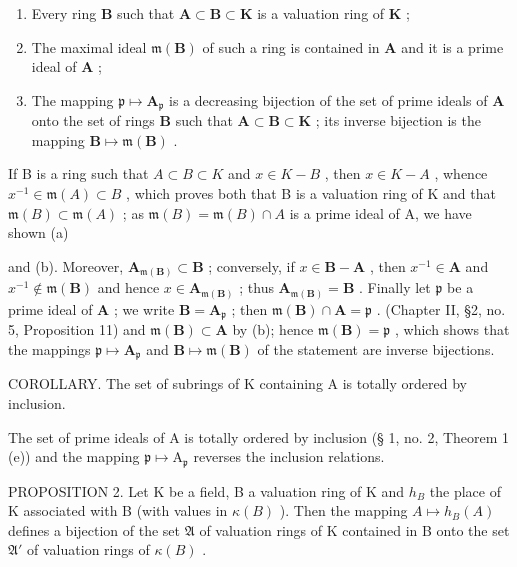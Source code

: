 \begin{enumerate}
\def\labelenumi{(\alph{enumi})}
\item
  Every ring \(\mathbf{B}\) such that \(\mathbf{A} \subset \mathbf{B} \subset \mathbf{K}\) is a valuation ring of \(\mathbf{K}\) ;
\item
  The maximal ideal \(\mathfrak{m}(\mathbf{B})\) of such a ring is contained in \(\mathbf{A}\) and it is a prime ideal of \(\mathbf{A}\) ;
\item
  The mapping \(\mathfrak{p} \mapsto \mathbf{A}_{\mathfrak{p}}\) is a decreasing bijection of the set of prime ideals of \(\mathbf{A}\) onto the set of rings \(\mathbf{B}\) such that \(\mathbf{A} \subset \mathbf{B} \subset \mathbf{K}\) ; its inverse bijection is the mapping \(\mathbf{B} \mapsto \mathfrak{m}(\mathbf{B})\) .
\end{enumerate}

If B is a ring such that \(A \subset B \subset K\) and \(x \in K - B\) , then \(x \in K - A\) , whence \(x^{-1} \in \mathfrak{m}(A) \subset B\) , which proves both that B is a valuation ring of K and that \(\mathfrak{m}(B) \subset \mathfrak{m}(A)\) ; as \(\mathfrak{m}(B) = \mathfrak{m}(B) \cap A\) is a prime ideal of A, we have shown (a)

and (b). Moreover, \(\mathbf{A}_{\mathfrak{m}(\mathbf{B})} \subset \mathbf{B}\) ; conversely, if \(x \in \mathbf{B} - \mathbf{A}\) , then \(x^{-1} \in \mathbf{A}\) and \(x^{-1} \notin \mathfrak{m}(\mathbf{B})\) and hence \(x \in \mathbf{A}_{\mathfrak{m}(\mathbf{B})}\) ; thus \(\mathbf{A}_{\mathfrak{m}(\mathbf{B})} = \mathbf{B}\) . Finally let \(\mathfrak{p}\) be a prime ideal of \(\mathbf{A}\) ; we write \(\mathbf{B} = \mathbf{A}_{\mathfrak{p}}\) ; then \(\mathfrak{m}(\mathbf{B}) \cap \mathbf{A} = \mathfrak{p}\) . (Chapter II, §2, no. 5, Proposition 11) and \(\mathfrak{m}(\mathbf{B}) \subset \mathbf{A}\) by (b); hence \(\mathfrak{m}(\mathbf{B}) = \mathfrak{p}\) , which shows that the mappings \(\mathfrak{p} \mapsto \mathbf{A}_{\mathfrak{p}}\) and \(\mathbf{B} \mapsto \mathfrak{m}(\mathbf{B})\) of the statement are inverse bijections.

COROLLARY. The set of subrings of K containing A is totally ordered by inclusion.

The set of prime ideals of A is totally ordered by inclusion (§ 1, no. 2, Theorem 1 (e)) and the mapping \(\mathfrak{p} \mapsto \mathrm{A}_{\mathfrak{p}}\) reverses the inclusion relations.

PROPOSITION 2. Let K be a field, B a valuation ring of K and \(h_B\) the place of K associated with B (with values in \(\kappa(B)\) ). Then the mapping \(A \mapsto h_B(A)\) defines a bijection of the set \(\mathfrak{A}\) of valuation rings of K contained in B onto the set \(\mathfrak{A}'\) of valuation rings of \(\kappa(B)\) .

